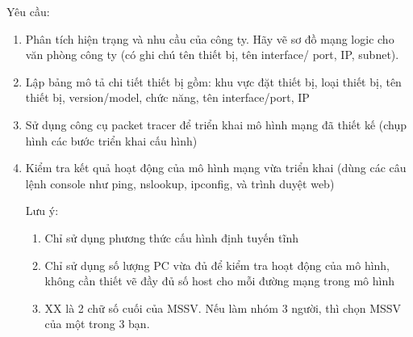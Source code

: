 Yêu cầu:
\begin{enumerate}
\bf \item Phân tích hiện trạng và nhu cầu của công ty. Hãy vẽ sơ đồ mạng logic cho văn phòng công ty (có ghi chú tên thiết bị, tên interface/ port, IP, subnet).

\rm 

\bf \item Lập bảng mô tả chi tiết thiết bị gồm: khu vực đặt thiết bị, loại thiết bị, tên thiết bị, version/model, chức năng, tên interface/port, IP

\rm

\bf \item Sử dụng công cụ packet tracer để triển khai mô hình mạng đã thiết kế (chụp hình các bước triển khai cấu hình)

\rm

\bf \item Kiểm tra kết quả hoạt động của mô hình mạng vừa triển khai (dùng các câu lệnh console như ping, nslookup, ipconfig, và trình duyệt web)

\rm Lưu ý:
\begin{enumerate}
\item Chỉ sử dụng phương thức cấu hình định tuyến tĩnh

\item Chỉ sử dụng số lượng PC vừa đủ để kiểm tra hoạt động của mô hình, không cần thiết vẽ đầy đủ số host cho mỗi đường mạng trong mô hình

\item XX là 2 chữ số cuối của MSSV. Nếu làm nhóm 3 người, thì chọn MSSV của một trong 3 bạn.
\end{enumerate}

\end{enumerate}






